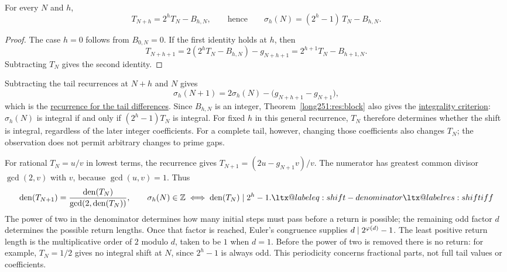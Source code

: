 \documentclass[11pt]{article}
\makeatletter
\newcommand{\compatlabel}[1]{\ltx@label{#1}}
\makeatother
\begin{document}
\begin{theorem}\label{long251:res:block}\compatlabel{res:block}
For every $N$ and $h$,
\[
 T_{N+h}=2^{h}T_N-B_{h,N},
 \qquad\text{hence}\qquad
 \sigma_h(N)=(2^{h}-1)\,T_N-B_{h,N} .
\]
\end{theorem}

\begin{proof}
The case $h=0$ follows from $B_{0,N}=0$.  If the first identity holds at
$h$, then
\[
 T_{N+h+1}=2(2^hT_N-B_{h,N})-g_{N+h+1}
          =2^{h+1}T_N-B_{h+1,N}.
\]
Subtracting $T_N$ gives the second identity.
\end{proof}

Subtracting the tail recurrences at $N+h$ and $N$ gives
\begin{equation}\label{long251:eq:shift-step}
 \sigma_h(N+1)=2\sigma_h(N)-\bigl(g_{N+h+1}-g_{N+1}\bigr),
\end{equation}
which is the
\href{https://github.com/wcook04/plectis-erdos/blob/3d6d938d696fed0fb71dd55115a18a73738ff223/lean/ErdosProblems/Erdos251/PrimeGapDyadicTail.lean\#L563}{recurrence for the tail differences}.
Since $B_{h,N}$ is an integer, Theorem~\ref{long251:res:block} also gives the
\href{https://github.com/wcook04/plectis-erdos/blob/3d6d938d696fed0fb71dd55115a18a73738ff223/lean/ErdosProblems/Erdos251/PrimeGapDyadicTail.lean\#L802}{integrality criterion}:
$\sigma_h(N)$ is integral if and only if $(2^h-1)T_N$ is integral.
For fixed $h$ in this general recurrence, $T_N$ therefore determines whether
the shift is integral, regardless of the later integer coefficients.
For a complete tail, however, changing those coefficients also changes
$T_N$; the observation does not permit arbitrary changes to prime gaps.

For rational $T_N=u/v$ in lowest terms, the recurrence gives
$T_{N+1}=(2u-g_{N+1}v)/v$.  The numerator has greatest common divisor
$\gcd(2,v)$ with $v$, because $\gcd(u,v)=1$.  Thus
\begin{equation}
 \operatorname{den}(T_{N+1})
 =\frac{\operatorname{den}(T_N)}{\gcd(2,\operatorname{den}(T_N))},
 \qquad
 \sigma_h(N)\in\Z
 \iff
 \operatorname{den}(T_N)\mid 2^h-1 .
\label{long251:eq:den-law}\compatlabel{eq:shift-denominator}\compatlabel{res:shiftiff}
\end{equation}
The power of two in the denominator determines how many initial steps
must pass before a return is possible; the remaining odd factor $d$
determines the possible return lengths.  Once that factor is reached,
Euler's congruence supplies $d\mid2^{\varphi(d)}-1$.  The least positive
return length is the multiplicative order of $2$ modulo $d$, taken to
be $1$ when $d=1$.  Before the power of two is removed there is no return:
for example, $T_N=1/2$ gives no integral shift at $N$, since $2^h-1$ is
always odd.  This periodicity concerns fractional parts, not full tail
values or coefficients.
\end{document}
